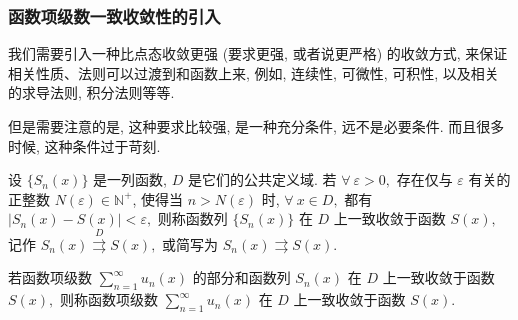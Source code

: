 \begin{frame}
\frametitle{函数项级数一致收敛性的引入}

我们需要引入一种比点态收敛更强 (要求更强, 或者说更严格) 的收敛方式, 来保证相关性质、法则可以过渡到和函数上来, 例如, 连续性, 可微性, 可积性, 以及相关的求导法则, 积分法则等等.

\pause

\begin{attnblock}
但是需要注意的是, 这种要求比较强, 是一种充分条件, 远不是必要条件. 而且很多时候, 这种条件过于苛刻.
\end{attnblock}

\pause

\begin{Def}[函数列的一致收敛]
设 $\{S_n(x)\}$ 是一列函数, $D$ 是它们的公共定义域. 若 $\forall ~ \varepsilon > 0,$ 存在仅与 $\varepsilon$ 有关的正整数 $N(\varepsilon) \in \mathbb{N}^+$, 使得当 $n > N(\varepsilon)$ 时, $\forall ~ x \in D,$ 都有 $|S_n(x) - S(x)| < \varepsilon,$ 则称函数列 $\{S_n(x)\}$ 在 $D$ 上\alert{一致收敛}于函数 $S(x),$ 记作 $S_n(x) \stackrel{D}{\rightrightarrows} S(x),$ 或简写为 $S_n(x) \rightrightarrows S(x).$
\end{Def}

\pause

\begin{Def}[函数项级数的一致收敛]
若函数项级数 $\sum_{n=1}^\infty u_n(x)$ 的部分和函数列 $S_n(x)$ 在 $D$ 上一致收敛于函数 $S(x),$ 则称函数项级数 $\sum_{n=1}^\infty u_n(x)$ 在 $D$ 上\alert{一致收敛}于函数 $S(x).$
\end{Def}

\end{frame}


